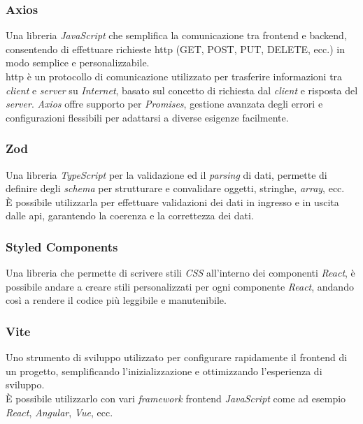 \subsubsection{Axios}

Una libreria \textit{JavaScript} che semplifica la comunicazione tra \gls{frontend} e \gls{backend}, consentendo di effettuare richieste \gls{http} (GET, POST, PUT, DELETE, ecc.) in modo semplice e personalizzabile. \\
\gls{http} è un protocollo di comunicazione utilizzato per trasferire informazioni tra \textit{client} e \textit{server} su \textit{Internet}, basato sul concetto di richiesta dal \textit{client} e risposta del \textit{server}.
\textit{Axios} offre supporto per \textit{Promises}, gestione avanzata degli errori e configurazioni flessibili per adattarsi a diverse esigenze facilmente.

\subsubsection{Zod}

Una libreria \textit{TypeScript} per la validazione ed il \textit{parsing} di dati, permette di definire degli \textit{schema} per strutturare e convalidare oggetti, stringhe, \textit{array}, ecc. \\
È possibile utilizzarla per effettuare validazioni dei dati in ingresso e in uscita dalle \gls{api}, garantendo la coerenza e la correttezza dei dati.
\subsubsection{Styled Components}

Una libreria che permette di scrivere stili \textit{CSS} all’interno dei componenti \textit{React}, è possibile andare a creare stili personalizzati per ogni componente \textit{React}, 
andando così a rendere il codice più leggibile e manutenibile.

\subsubsection{Vite}

Uno strumento di sviluppo utilizzato per configurare rapidamente il \gls{frontend} di un progetto, semplificando l'inizializzazione e ottimizzando l'esperienza di sviluppo.\\
È possibile utilizzarlo con vari \textit{framework} \gls{frontend} \textit{JavaScript} come ad esempio \textit{React}, \textit{Angular}, \textit{Vue}, ecc.


